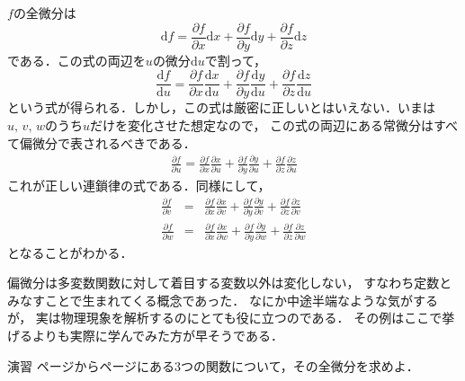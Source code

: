 $f$の全微分は
$$
\mathrm{d}f =
\frac{\partial f}{\partial x} \mathrm{d}x + \frac{\partial f}{\partial y} \mathrm{d}y +  \frac{\partial f}{\partial z}\mathrm{d}z
$$
である．この式の両辺を$u$の微分$\mathrm{d}u$で割って，
$$
\frac{\mathrm{d}f}{\mathrm{d}u} =
\frac{\partial f}{\partial x} \frac{\mathrm{d}x}{\mathrm{d}u} 
+ \frac{\partial f}{\partial y} \frac{\mathrm{d}y}{\mathrm{d}u} 
+  \frac{\partial f}{\partial z} \frac{\mathrm{d}z}{\mathrm{d}u}
$$
という式が得られる．しかし，この式は厳密に正しいとはいえない．いまは$u, \, v, \, w$のうち$u$だけを変化させた想定なので，
この式の両辺にある常微分はすべて偏微分で表されるべきである．
\begin{eqnarray}
\frac{\partial f}{\partial u} =
\frac{\partial f}{\partial x} \frac{\partial x}{\partial u} 
+ \frac{\partial f}{\partial y} \frac{\partial y}{\partial u} 
+  \frac{\partial f}{\partial z} \frac{\partial z}{\partial u}
\label{eq:rensarituu}
\end{eqnarray}
これが正しい連鎖律の式である．同様にして，
\begin{eqnarray}
\frac{\partial f}{\partial v} & = &
\frac{\partial f}{\partial x} \frac{\partial x}{\partial v} 
+ \frac{\partial f}{\partial y} \frac{\partial y}{\partial v} 
+  \frac{\partial f}{\partial z} \frac{\partial z}{\partial v} 
\label{eq:rensarituv} \\
\frac{\partial f}{\partial w} & = &
\frac{\partial f}{\partial x} \frac{\partial x}{\partial w} 
+ \frac{\partial f}{\partial y} \frac{\partial y}{\partial w} 
+  \frac{\partial f}{\partial z} \frac{\partial z}{\partial w}
\label{eq:rensarituw}
\end{eqnarray}
となることがわかる．

偏微分は多変数関数に対して着目する変数以外は変化しない，
すなわち定数とみなすことで生まれてくる概念であった．
なにか中途半端なような気がするが，
実は物理現象を解析するのにとても役に立つのである．
その例はここで挙げるよりも実際に学んでみた方が早そうである．
\begin{itembox}[l]{演習}
\pageref{ex:henbibun}ページから\pageref{ex:henbibun2}ページにある3つの関数について，その全微分を求めよ．
\end{itembox}